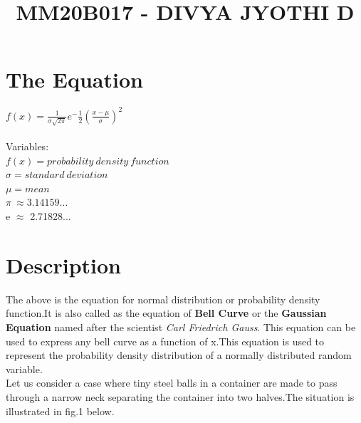 \documentclass{article}
\title{MM20B017 - DIVYA JYOTHI D}
\begin{document}
\date{}
\maketitle


\section{The Equation}

 {\huge $f(x)= \frac{1}{\sigma \sqrt{2\pi}} e^-\frac{1}{2}(\frac{x-\mu}{\sigma})^2$}
 \\
\\Variables:
\\$f(x) = probability \ density \ function$
 \\ $\sigma = standard \ deviation $
 \\$ \mu = mean$
 \\ $\pi \ \approx 3.14159... $
 \\ e $\approx$ 2.71828...
 \section{Description}
 The above is the equation for normal distribution or probability density function.It is also called as the equation of \textbf {Bell Curve} or the \textbf{Gaussian Equation} named after the scientist {\emph{Carl Friedrich Gauss}}. This equation can be used to express any bell curve as a function of x.This equation is used to represent the probability density distribution of a normally distributed random variable.
 \\Let us consider a case where tiny steel balls in a container are made to pass through a narrow neck separating the container into two halves.The situation is illustrated in fig.1 below. \\
 
\end{document}
